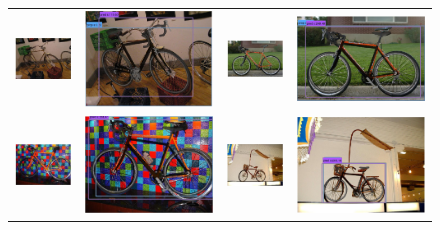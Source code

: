 \documentclass[10pt,twocolumn,letterpaper]{article}
\begin{document}
\begin{figure}[h]
\setlength\tabcolsep{1pt}
\centering
\begin{tabular}{|cc|cc|}
  \hline
  \includegraphics[width=0.22\linewidth]{supp/pas_bicycle3a.png} &
  \includegraphics[width=0.22\linewidth]{supp/pas_bicycle3b.png} & 
  \includegraphics[width=0.22\linewidth]{supp/pas_bicycle13a.png} &
  \includegraphics[width=0.22\linewidth]{supp/pas_bicycle13b.png}  \\
  \includegraphics[width=0.22\linewidth]{supp/pas_bicycle5a.png} &
  \includegraphics[width=0.22\linewidth]{supp/pas_bicycle5b.png} & 
  \includegraphics[width=0.22\linewidth]{supp/pas_bicycle6a.png} &
  \includegraphics[width=0.22\linewidth]{supp/pas_bicycle6b.png}  \\

\end{tabular}
\end{figure}
\end{document}

